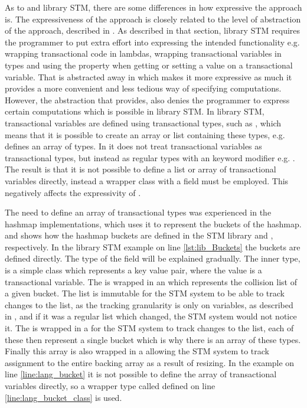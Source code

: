 As to \stmname and library \ac{STM}, there are some differences in how expressive the approach is. The expressiveness of the approach is closely related to the level of abstraction of the approach, described in . As described in that section, library \ac{STM} requires the programmer to put extra effort into expressing the intended functionality e.g. wrapping transactional code in lambdas, wrapping transactional variables in  types and using the  property when getting or setting a value on a transactional variable. That is abstracted away in \stmname which makes it more expressive as much it provides a more convenient and less tedious way of specifying computations. However, the abstraction that \stmname provides, also denies the programmer to express certain computations which is possible in library \ac{STM}. In library \ac{STM}, transactional variables are defined using transactional types, such as , which means that it is possible to create an array or list containing these types, e.g.  defines an array of  types. In \stmname it does not treat transactional variables as transactional types, but instead as regular types with an  keyword modifier e.g. . The result is that it is not possible to define a list or array of transactional variables directly, instead a wrapper class with a  field must be employed. This negatively affects the expressivity of \stmname. 

The need to define an array of transactional types was experienced in the hashmap implementations, which uses it to represent the buckets of the hashmap.  and  shows how the hashmap buckets are defined in the \ac{STM} library and \stmname, respectively. In the library \ac{STM} example on line \ref{lst:lib_Buckets} the buckets are defined directly. The type of the  field will be explained gradually. The inner  type, is a simple class which represents a key value pair, where the value is a transactional variable. The  is wrapped in an  which represents the collision list of a given bucket. The list is immutable for the \ac{STM} system to be able to track changes to the list, as the tracking granularity is only on variables, as described in , and if it was a regular list which changed, the \ac{STM} system would not notice it. The  is wrapped in a  for the \ac{STM} system to track changes to the list, each of these then represent a single bucket which is why there is an array of these types. Finally this array is also wrapped in a  allowing the \ac{STM} system to track assignment to the entire backing array as a result of resizing. In the \stmname example on line \ref{line:lang_bucket} it is not possible to define the array of transactional variables directly, so a wrapper type called  defined on line \ref{line:lang_bucket_class} is used.

